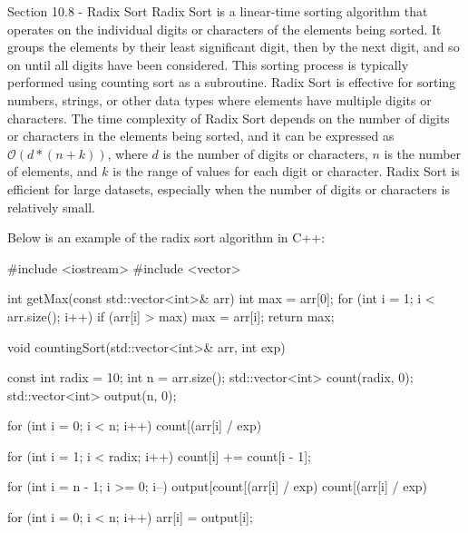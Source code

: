 \begin{notes}{Section 10.8 - Radix Sort}
    Radix Sort is a linear-time sorting algorithm that operates on the individual digits or characters of the elements being sorted. It groups the elements by their least significant digit, then by the next digit, and so on until all digits have been considered. This sorting process is typically performed using counting sort as a subroutine. Radix Sort
    is effective for sorting numbers, strings, or other data types where elements have multiple digits or characters. The time complexity of Radix Sort depends on the number of digits or characters in the elements being sorted, and it can be expressed as 
    $\mathcal{O}(d*(n+k))$, where $d$ is the number of digits or characters, $n$ is the number of elements, and $k$ is the range of values for each digit or character. Radix Sort is efficient for large datasets, especially when the number of digits or characters is relatively small.
    
    \begin{highlight}
        Below is an example of the radix sort algorithm in C++:
    
        \begin{code}[C++]
        #include <iostream>
        #include <vector>
        
        int getMax(const std::vector<int>& arr) {
            int max = arr[0];
            for (int i = 1; i < arr.size(); i++) {
                if (arr[i] > max) {
                    max = arr[i];
                }
            }
            return max;
        }
        
        void countingSort(std::vector<int>& arr, int exp) {
            const int radix = 10;
            int n = arr.size();
            std::vector<int> count(radix, 0);
            std::vector<int> output(n, 0);
        
            for (int i = 0; i < n; i++) {
                count[(arr[i] / exp) %
            }
        
            for (int i = 1; i < radix; i++) {
                count[i] += count[i - 1];
            }
        
            for (int i = n - 1; i >= 0; i--) {
                output[count[(arr[i] / exp) %
                count[(arr[i] / exp) %
            }
        
            for (int i = 0; i < n; i++) {
                arr[i] = output[i];
            }
        }
        

\end{code}
\end{highlight}
\end{notes}

